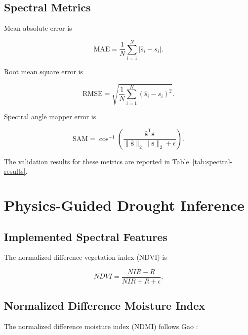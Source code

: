 \documentclass[11pt,a4paper]{article}
\newcommand{\vect}[1]{\bm{#1}}
\begin{document}
\subsection{Spectral Metrics}

Mean absolute error is

\begin{equation}
\mathrm{MAE}
=
\frac{1}{N}
\sum_{i=1}^{N}
\left|
\hat{s}_i-s_i
\right|.
\end{equation}

Root mean square error is

\begin{equation}
\mathrm{RMSE}
=
\sqrt{
\frac{1}{N}
\sum_{i=1}^{N}
(\hat{s}_i-s_i)^2
}.
\end{equation}

Spectral angle mapper error is

\begin{equation}
\mathrm{SAM}
=
\cos^{-1}
\left(
\frac{
\hat{\vect{s}}^\mathsf T\vect{s}
}{
\|\hat{\vect{s}}\|_2
\|\vect{s}\|_2+\epsilon
}
\right).
\end{equation}

The validation results for these metrics are reported in
Table~\ref{tab:spectral-results}.


\section{Physics-Guided Drought Inference}

\subsection{Implemented Spectral Features}

The normalized difference vegetation index (NDVI)
\cite{rouse1974} is

\begin{equation}
NDVI
=
\frac{
NIR-R
}{
NIR+R+\epsilon
}.
\end{equation}

\subsection{Normalized Difference Moisture Index}

The normalized difference moisture index (NDMI) follows Gao
\cite{gao1996}:
\end{document}
